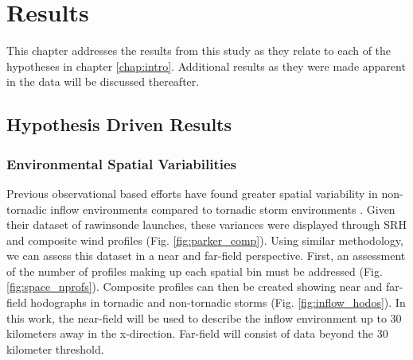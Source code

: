 \chapter{Results}
\label{chap:results}

This chapter addresses the results from this study as they relate to each of the hypotheses in chapter \ref{chap:intro}. Additional results as they were made apparent in the data will be discussed thereafter.

\section{Hypothesis Driven Results}
\subsection{Environmental Spatial Variabilities}
Previous observational based efforts have found greater spatial variability in non-tornadic inflow environments compared to tornadic storm environments \citep{parker2014composite}. Given their dataset of rawinsonde launches, these variances were displayed through SRH and composite wind profiles (Fig. \ref{fig:parker_comp}). Using similar methodology, we can assess this dataset in a near and far-field perspective. First, an assessment of the number of profiles making up each spatial bin must be addressed (Fig. \ref{fig:space_nprofs}). Composite profiles can then be created showing near and far-field hodographs in tornadic and non-tornadic storms (Fig. \ref{fig:inflow_hodos}). In this work, the near-field will be used to describe the inflow environment up to 30 kilometers away in the x-direction. Far-field will consist of data beyond the 30 kilometer threshold. 


